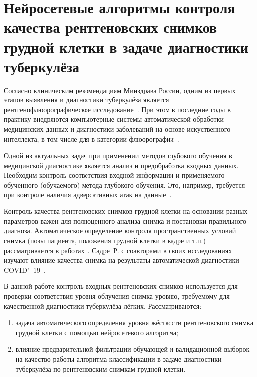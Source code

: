 \chapter{Нейросетевые алгоритмы контроля качества рентгеновских снимков грудной клетки в задаче диагностики туберкулёза}\label{ch:ch3}

Согласно клиническим рекомендациям Минздрава России, одним из первых этапов выявления и диагностики туберкулёза является рентгенофлюорографическое исследование~\cite{васильева2022туберкулез}. При этом в последние годы в практику внедряются компьютерные системы автоматической обработки медицинских данных и диагностики заболеваний на основе искуственного интеллекта, в том числе для в категории флюорографии~\cite{СМ106054, рг2023, рбк2023, интерфакс2023}.

Одной из актуальных задач при применении методов глубокого обучения в медицинской диагностике является анализ и предобработка входных данных. Необходим контроль соответствия входной информации и применяемого обученного (обучаемого) метода глубокого обучения. Это, например, требуется при контроле наличия адверсативных атак на данные~\cite{finlayson2019adversarial}.

Контроль качества рентгеновских снимков грудной клетки на основании разных параметров важен для полноценного анализа снимка и постановки правильного диагноза. Автоматическое определение контроля пространственных условий снимка (позы пациента, положения грудной клетки в кадре и т.п.) рассматривается в работах~\cite{nousiainen2021automating, von2020robust, jia2019application}. Садре~Р. с соавторами в своих исследованиях изучают влияние качества снимка на результаты автоматической диагностики COVID"~19~\cite{sadre2021validating}.

В данной работе контроль входных рентгеновских снимков используется для проверки соответствия уровня облучения снимка уровню, требуемому для качественной диагностики туберкулёза лёгких. Рассматриваются:
\begin{enumerate}
	\item задача автоматического определения уровня жёсткости рентгеновского снимка грудной клетки с помощью нейросетевого алгоритма;
	\item влияние предварительной фильтрации обучающей и валидационной выборок на качество работы алгоритма классификации в задаче диагностики туберкулёза по рентгеновским снимкам грудной клетки.
\end{enumerate}

